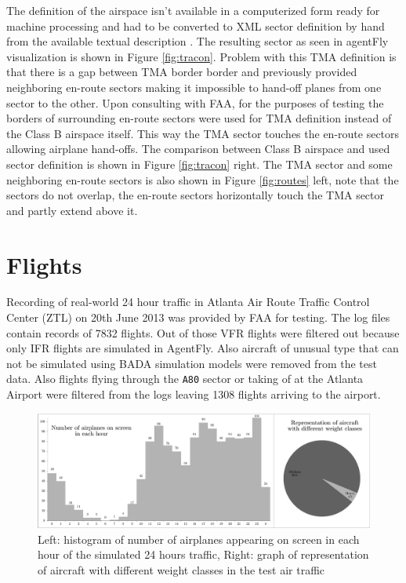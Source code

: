 The definition of the airspace isn't available in a computerized form ready for machine processing and had to be converted to XML sector definition by hand from the available textual description \cite{atlanta-tma}. The resulting sector as seen in agentFly visualization is shown in Figure \ref{fig:tracon}. Problem with this TMA definition is that there is a gap between TMA border border and previously provided neighboring en-route sectors making it impossible to hand-off planes from one sector to the other. Upon consulting with FAA, for the purposes of testing the borders of surrounding en-route sectors were used for TMA definition  instead of the Class B airspace itself. This way the TMA sector touches the en-route sectors allowing airplane hand-offs. The comparison between Class B airspace and used sector definition is shown in Figure \ref{fig:tracon} right. The TMA sector and some neighboring en-route sectors is also shown in Figure \ref{fig:routes} left, note that the sectors do not overlap, the en-route sectors horizontally touch the TMA sector and partly extend above it.

\section{Flights}

\label{section:flights}

Recording of real-world 24 hour traffic in Atlanta Air Route Traffic Control Center (ZTL) on 20th June 2013 was provided by FAA for testing. The log files contain records of 7832 flights. Out of those VFR flights were filtered out because only IFR flights are simulated in AgentFly. Also aircraft of unusual type that can not be simulated using BADA simulation models were removed from the test data. Also flights flying through the \texttt{A80} sector or taking of at the Atlanta Airport were filtered from the logs leaving 1308 flights arriving to the airport.

\begin{figure}[h]
    \centering
    \includegraphics[width=\textwidth]{graphs/real-flights.pdf}
    \caption{Left: histogram of number of airplanes appearing on screen in each hour of the simulated 24 hours traffic, Right: graph of representation of aircraft with different weight classes in the test air traffic}
    \label{graph:flights}
\end{figure}

